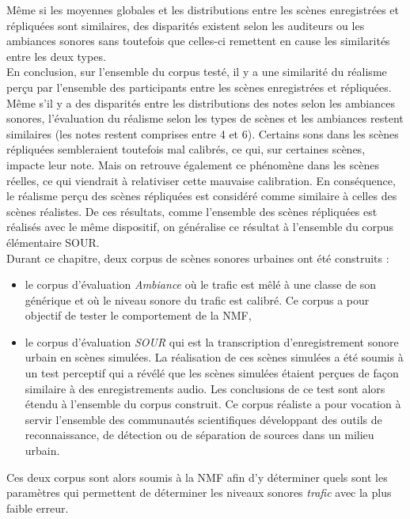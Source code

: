 Même si les moyennes globales et les distributions entre les scènes enregistrées et répliquées sont similaires, des disparités existent selon les auditeurs ou les ambiances sonores sans toutefois que celles-ci remettent en cause les similarités entre les deux types.\\


En conclusion, sur l'ensemble du corpus testé, il y a une similarité du réalisme perçu par l'ensemble des participants entre les scènes enregistrées et répliquées. Même s'il y a des disparités entre les distributions des notes selon les ambiances sonores, l'évaluation du réalisme selon les types de scènes et les ambiances restent similaires (les notes restent comprises entre 4 et 6). 
Certains sons dans les scènes répliquées sembleraient toutefois mal calibrés, ce qui, sur certaines scènes, impacte leur note. Mais on retrouve également ce phénomène dans les scènes réelles, ce qui viendrait à relativiser cette mauvaise calibration.
En conséquence, le réalisme perçu des scènes répliquées est considéré comme similaire à celles des scènes réalistes. 
De ces résultats, comme l'ensemble des scènes répliquées est réalisés avec le même dispositif, on généralise ce résultat à l'ensemble du corpus élémentaire SOUR.\\

Durant ce chapitre, deux corpus de scènes sonores urbaines ont été construits :
\begin{itemize}
\item le corpus d'évaluation \textit{Ambiance} où le trafic est mêlé à une classe de son générique et où le niveau sonore du trafic est calibré.  Ce corpus a pour objectif de tester le comportement de la NMF,
\item le corpus d'évaluation \textit{SOUR} qui est la transcription d'enregistrement sonore urbain en scènes simulées. La réalisation de ces scènes simulées a été soumis à un test perceptif qui a révélé que les scènes simulées étaient perçues de façon similaire à des enregistrements audio. Les conclusions de ce test sont alors étendu à l'ensemble du corpus construit. Ce corpus réaliste a pour vocation à servir l'ensemble des communautés scientifiques développant des outils de reconnaissance, de détection ou de séparation de sources dans un milieu urbain. \\
\end{itemize}

Ces deux corpus sont alors soumis à la NMF afin d'y déterminer quels sont les paramètres qui permettent de déterminer les niveaux sonores \textit{trafic} avec la plus faible erreur.


